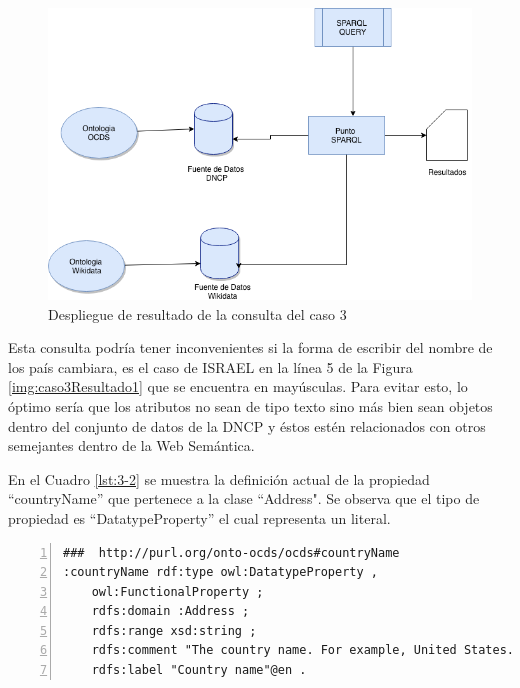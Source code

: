  \begin{figure}[ht!]
    \centering
    \includegraphics[width=150mm]{figuras/Diagramas-Caso3.png}
    \caption{Despliegue de resultado de la consulta del caso 3}
    \label{img:DiagramaCaso3}
 \end{figure}

 Esta consulta podría tener inconvenientes si la forma de escribir del nombre de los país cambiara, es el caso de ISRAEL en la línea 5 de la Figura \ref{img:caso3Resultado1} que se encuentra en mayúsculas. Para evitar esto, lo óptimo sería que los atributos no sean de tipo texto sino más bien sean objetos dentro del conjunto de datos de la DNCP y éstos estén relacionados con otros semejantes dentro de la Web Semántica.

En el Cuadro \ref{lst:3-2} se muestra la definición actual de la propiedad “countryName” que pertenece a la clase “Address". Se observa que el tipo de propiedad es “DatatypeProperty” el cual representa un literal.\hfill \break 

\noindent\begin{minipage}[c]{\textwidth}
\begin{lstlisting}[captionpos=b, caption=Definicion de la propiedad countryName, label={lst:3-2},  numbers=left,  numberstyle=\tiny\color{mygray},
    basicstyle=\footnotesize\ttfamily,frame=single]
###  http://purl.org/onto-ocds/ocds#countryName
:countryName rdf:type owl:DatatypeProperty ,
    owl:FunctionalProperty ;
    rdfs:domain :Address ;
    rdfs:range xsd:string ;
    rdfs:comment "The country name. For example, United States."@en ;
    rdfs:label "Country name"@en .
 \end{lstlisting}
\end{minipage}

